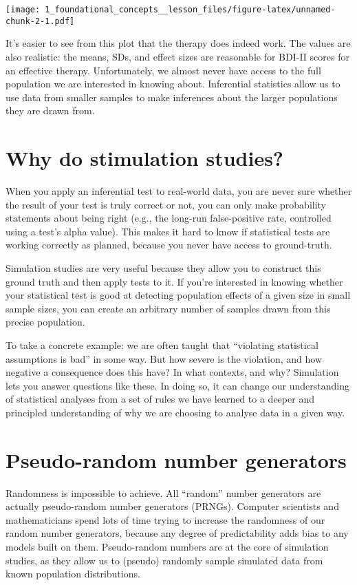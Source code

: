 \documentclass[
]{article}
\begin{document}
\texttt{[image: 1\_foundational\_concepts\_\_lesson\_files/figure-latex/unnamed-chunk-2-1.pdf]}

It's easier to see from this plot that the therapy does indeed work. The
values are also realistic: the means, SDs, and effect sizes are
reasonable for BDI-II scores for an effective therapy. Unfortunately, we
almost never have access to the full population we are interested in
knowing about. Inferential statistics allow us to use data from smaller
samples to make inferences about the larger populations they are drawn
from.

\hypertarget{why-do-stimulation-studies}{%
\section{Why do stimulation studies?}\label{why-do-stimulation-studies}}

When you apply an inferential test to real-world data, you are never
sure whether the result of your test is truly correct or not, you can
only make probability statements about being right (e.g., the long-run
false-positive rate, controlled using a test's alpha value). This makes
it hard to know if statistical tests are working correctly as planned,
because you never have access to ground-truth.

Simulation studies are very useful because they allow you to construct
this ground truth and then apply tests to it. If you're interested in
knowing whether your statistical test is good at detecting population
effects of a given size in small sample sizes, you can create an
arbitrary number of samples drawn from this precise population.

To take a concrete example: we are often taught that ``violating
statistical assumptions is bad'' in some way. But how severe is the
violation, and how negative a consequence does this have? In what
contexts, and why? Simulation lets you answer questions like these. In
doing so, it can change our understanding of statistical analyses from a
set of rules we have learned to a deeper and principled understanding of
why we are choosing to analyse data in a given way.

\hypertarget{pseudo-random-number-generators}{%
\section{Pseudo-random number
generators}\label{pseudo-random-number-generators}}

Randomness is impossible to achieve. All ``random'' number generators
are actually pseudo-random number generators (PRNGs). Computer
scientists and mathematicians spend lots of time trying to increase the
randomness of our random number generators, because any degree of
predictability adds bias to any models built on them. Pseudo-random
numbers are at the core of simulation studies, as they allow us to
(pseudo) randomly sample simulated data from known population
distributions.
\end{document}
